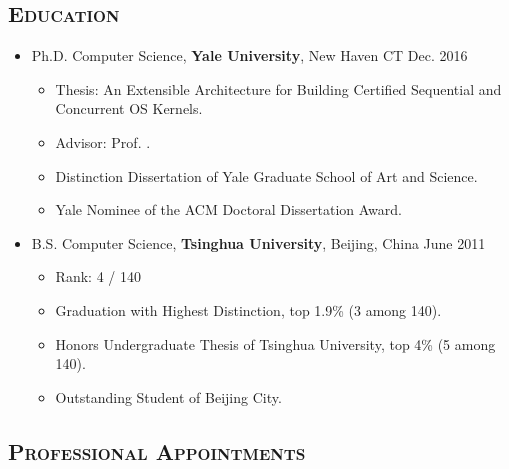 \documentclass[10pt]{article}
\newcommand{\mhref}[3][black]{\href{#2}{\color{#1}{#3}}}%
\renewcommand{\section}[1]{
	\vspace{-5pt}
   	\subsection*{\scshape  \bfseries #1}
   }
\newenvironment{innerlist}[1][\enskip\textbullet]%
        {\begin{itemize}[#1,leftmargin=25pt,parsep=0pt,itemsep=2pt,topsep=2pt,partopsep=0pt]}
        {\end{itemize}}
\newcommand\yale{\textbf{Yale University}}
\newcommand\tsinghua{\textbf{Tsinghua University}}
\newcommand\zhong{\mhref{http://www.cs.yale.edu/homes/shao/}{Zhong Shao}}
\begin{document}
\section{Education}
\begin{innerlist}
\item[] Ph.D. Computer Science, \yale{}, New Haven CT
\hfill{Dec. 2016}
        \begin{innerlist}
       \item Thesis: An Extensible Architecture for Building Certified Sequential and Concurrent OS Kernels.
       \item Advisor: Prof. \zhong.
       \item {Distinction Dissertation} of Yale Graduate School of Art and Science.
       \item Yale Nominee of the ACM Doctoral Dissertation Award.
        \end{innerlist}

\vspace{0.05in}

%
%

\vspace{0.05in}

\item[] B.S. Computer Science, \tsinghua{}, Beijing, China
\hfill{June 2011}
        \begin{innerlist}
        \item Rank: {4 / 140}
        \item Graduation with Highest Distinction, top 1.9\% (3 among 140).
        \item Honors Undergraduate Thesis of Tsinghua University, top 4\% (5 among 140).
        \item Outstanding Student of Beijing City.
        \end{innerlist}

\end{innerlist}

\section{Professional Appointments}
\end{document}
